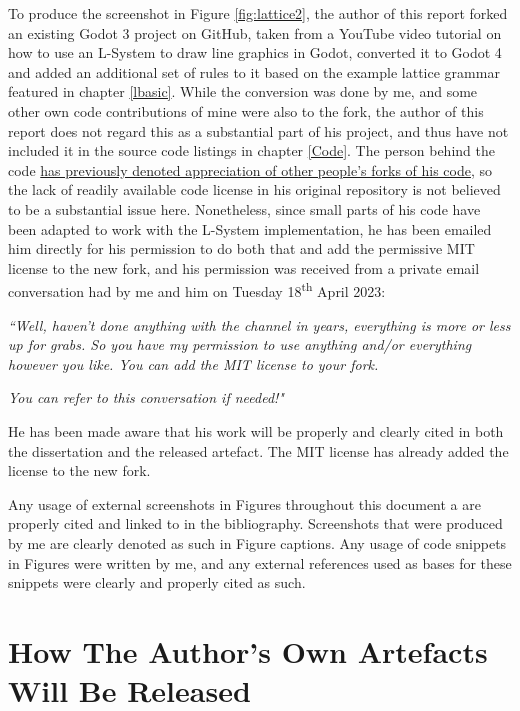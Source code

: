 To produce the screenshot in Figure \ref{fig:lattice2}, the author of this report forked an existing Godot 3 project on GitHub\cite{codatGD3LSystemGH}, taken from a YouTube video tutorial on how to use an L-System to draw line graphics in Godot\cite{codatGD3LSystemYT}, converted it to Godot 4 and added an additional set of rules to it based on the example lattice grammar featured in chapter \ref{lbasic}.\cite{codatGD4LSystemGH} While the conversion was done by me, and some other own code contributions of mine were also to the fork, the author of this report does not regard this as a substantial part of his project, and thus have not included it in the source code listings in chapter \ref{Code}. The person behind the code \hyperlink{https://www.youtube.com/watch?v=eY9XkJERiG0&lc=UgwXjzr7jheuC9hH18h4AaABAg}{has previously denoted appreciation of other people's forks of his code}, so the lack of readily available code license in his original repository is not believed to be a substantial issue here. Nonetheless, since small parts of his code have been adapted to work with the L-System implementation, he has been emailed him directly for his permission to do both that and add the permissive MIT license to the new fork, and his permission was received from a private email conversation had by me and him on Tuesday 18\textsuperscript{th} April 2023:

\textit{``Well, haven't done anything with the channel in years, everything is more or less up for grabs. So you have my permission to use anything and/or everything however you like. You can add the MIT license to your fork.}

\textit{You can refer to this conversation if needed!"}

He has been made aware that his work will be properly and clearly cited in both the dissertation and the released artefact. The MIT license has already added the license to the new fork.\cite{codatGD4LSystemGH}

Any usage of external screenshots in Figures throughout this document a are properly cited and linked to in the bibliography. Screenshots that were produced by me are clearly denoted as such in Figure captions. Any usage of code snippets in Figures were written by me, and any external references used as bases for these snippets were clearly and properly cited as such.

\section{How The Author's Own Artefacts Will Be Released} \label{howrelease}

